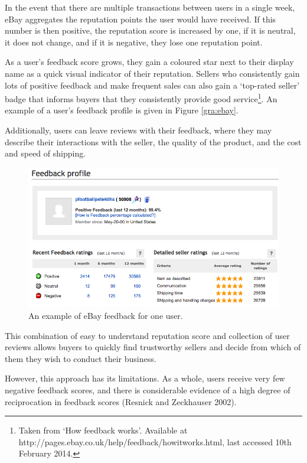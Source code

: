 \documentclass[]{final_report}
\begin{document}
In the event that there are multiple transactions between users in a single week, eBay aggregates the reputation points the user would have received. If this number is then positive, the reputation score is increased by one, if it is neutral, it does not change, and if it is negative, they lose one reputation point.

As a user's feedback score grows, they gain a coloured star next to their display name as a quick visual indicator of their reputation. Sellers who consistently gain lots of positive feedback and make frequent sales can also gain a `top-rated seller' badge that informs buyers that they consistently provide good service\footnote{Taken from `How feedback works'. Available at http://pages.ebay.co.uk/help/feedback/howitworks.html, last accessed 10th February 2014.}. An example of a user's feedback profile is given in Figure \ref{gra:ebay}.

Additionally, users can leave reviews with their feedback, where they may describe their interactions with the seller, the quality of the product, and the cost and speed of shipping.

\begin{figure}[ht!]
\centering
\includegraphics[width=140mm]{chap2/ebayfeedback.PNG}
\caption{An example of eBay feedback for one user.}
\end{figure}\label{gra:ebay}

This combination of easy to understand reputation score and collection of user reviews allows buyers to quickly find trustworthy sellers and decide from which of them they wish to conduct their business.

However, this approach has its limitations. As a whole, users receive very few negative feedback scores, and there is considerable evidence of a high degree of reciprocation in feedback scores (Resnick and Zeckhauser 2002).
\end{document}
